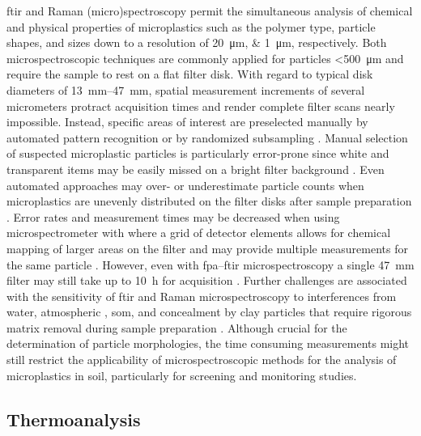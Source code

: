 \ac{ftir} and Raman (micro)spectroscopy permit the simultaneous analysis of chemical and physical properties of microplastics such as the polymer type, particle shapes, and sizes down to a resolution of \SIlist{20;1}{\micro\meter}, respectively. Both microspectroscopic techniques are commonly applied for particles \SI{<500}{\micro\meter} and require the sample to rest on a flat filter disk. With regard to typical disk diameters of \SIrange{13}{47}{\milli\meter}, spatial measurement increments of several micrometers protract acquisition times and render complete filter scans nearly impossible. Instead, specific areas of interest are preselected manually by automated pattern recognition or by randomized subsampling \citep{AngerRaman2018,XuFTIR2019}. Manual selection of suspected microplastic particles is particularly error-prone since white and transparent items may be easily missed on a bright filter background \citep{LaresIntercomparison2019}. Even automated approaches may over- or underestimate particle counts when microplastics are unevenly distributed on the filter disks after sample preparation \citep{AngerRaman2018}. Error rates and measurement times may be decreased when using  microspectrometer with  where a grid of detector elements allows for chemical mapping of larger areas on the filter and may provide multiple measurements for the same particle \citep{SimonQuantification2018}. However, even with \ac{fpa}--\ac{ftir} microspectroscopy a single \SI{47}{\milli\meter} filter may still take up to \SI{10}{\hour} for acquisition \citep{MintenigIdentification2017}. Further challenges are associated with the sensitivity of \ac{ftir} and Raman microspectroscopy to interferences from water, atmospheric , \ac{som}, and concealment by clay particles that require rigorous matrix removal during sample preparation \citep{AngerRaman2018,XuFTIR2019}. Although crucial for the determination of particle morphologies, the time consuming measurements might still restrict the applicability of microspectroscopic methods for the analysis of microplastics in soil, particularly for screening and monitoring studies.

\subsection{Thermoanalysis}
\label{sec:analytical-techniques:thermoanalysis}

